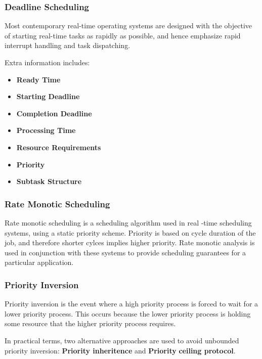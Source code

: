 \documentclass[11pt]{article}
\begin{document}
\subsubsection{Deadline Scheduling}
\label{sec:orgheadline116}

Most contemporary real-time operating systems are designed with
the objective of starting real-time tasks as rapidly as possible,
and hence emphasize rapid interrupt handling and task dispatching.

Extra information includes:

\begin{itemize}
\item \textbf{Ready Time}
\item \textbf{Starting Deadline}
\item \textbf{Completion Deadline}
\item \textbf{Processing Time}
\item \textbf{Resource Requirements}
\item \textbf{Priority}
\item \textbf{Subtask Structure}
\end{itemize}

\subsubsection{Rate Monotic Scheduling}
\label{sec:orgheadline117}

Rate monotic scheduling is a scheduling algorithm used in real
-time scheduling systems, using a static priority scheme. Priority
is based on cycle duration of the job, and therefore shorter cylces
implies higher priority. Rate monotic analysis is used in 
conjunction with these systems to provide scheduling guarantees for
a particular application.

\subsubsection{Priority Inversion}
\label{sec:orgheadline118}

Priority inversion is the event where a high priority process is
forced to wait for a lower priority process. This occurs because
the lower priority process is holding some resource that the higher
priority process requires. 

In practical terms, two alternative approaches are used to avoid 
unbounded priority inversion: \textbf{Priority inheritence} and \textbf{Priority}
\textbf{ceiling protocol}.
\end{document}
